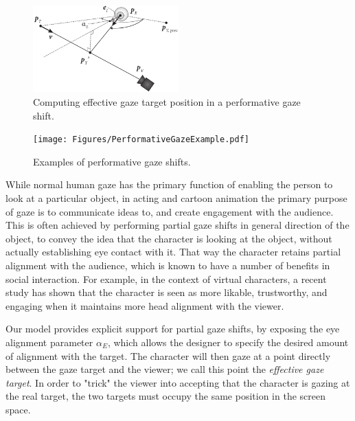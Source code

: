 
\begin{figure}[b]
\centering
\includegraphics[width=0.5\textwidth]{Figures/EyeAlignment.pdf}
\caption{Computing effective gaze target position in a performative gaze shift.}
\label{fig:EyeAlignment}
\end{figure}

\begin{figure}
\centering
\texttt{[image: Figures/PerformativeGazeExample.pdf]}
\caption{Examples of performative gaze shifts.}
\label{fig:PerformativeGazeExample}
\end{figure}

While normal human gaze has the primary function of enabling the person to look at a particular object, in acting and cartoon animation the primary purpose of gaze is to communicate ideas to, and create engagement with the audience. This is often achieved by performing partial gaze shifts in general direction of the object, to convey the idea that the character is looking at the object, without actually establishing eye contact with it. That way the character retains partial alignment with the audience, which is known to have a number of benefits in social interaction. For example, in the context of virtual characters, a recent study \cite{andrist2012designing} has shown that the character is seen as more likable, trustworthy, and engaging when it maintains more head alignment with the viewer.

Our model provides explicit support for partial gaze shifts, by exposing the eye alignment parameter $\alpha_E$, which allows the designer to specify the desired amount of alignment with the target. The character will then gaze at a point directly between the gaze target and the viewer; we call this point the \textit{effective gaze target}. In order to "trick" the viewer into accepting that the character is gazing at the real target, the two targets must occupy the same position in the screen space.

